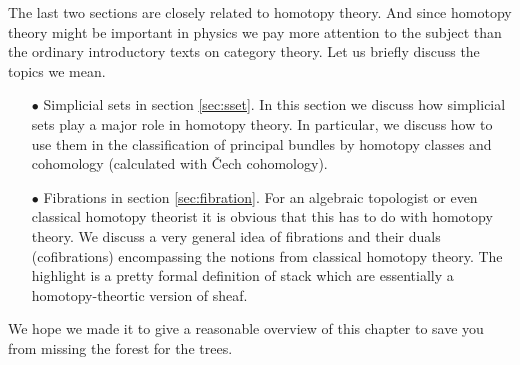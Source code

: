 The last two sections are closely related to homotopy theory. And since homotopy theory might be important in physics we pay more attention to the subject than the ordinary introductory texts on category theory. Let us briefly discuss the topics we mean.
\begin{enumerate}
\item[$\bullet$]
Simplicial sets in section \ref{sec:sset}. In this section we discuss how simplicial sets play a major role in homotopy theory. In particular, we discuss how to use them in the classification of principal bundles by homotopy classes and cohomology ({\glqq}calculated{\grqq} with \v{C}ech cohomology).
\item[$\bullet$]
Fibrations in section \ref{sec:fibration}. For an algebraic topologist or even classical homotopy theorist it is obvious that this has to do with homotopy theory. We discuss a very general idea of fibrations and their duals (cofibrations) encompassing the notions from classical homotopy theory. The highlight is a pretty formal definition of {\glqq}stack{\grqq} which are essentially a homotopy-theortic version of sheaf.
\end{enumerate}
We hope we made it to give a reasonable overview of this chapter to save you from missing the forest for the trees.
